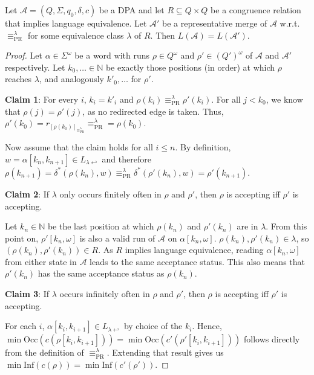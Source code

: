 \begin{theorem}
	Let $\mathcal{A} = (Q, \Sigma, q_0, \delta, c)$ be a DPA and let $R \subseteq Q \times Q$ be a congruence relation that implies language equivalence. Let $\mathcal{A}'$ be a representative merge of $\mathcal{A}$ w.r.t. $\equiv_\text{PR}^\lambda$ for some equivalence class $\lambda$ of $R$. Then $L(\mathcal{A}) = L(\mathcal{A}')$.
\end{theorem}

\begin{proof}
	Let $\alpha \in \Sigma^\omega$ be a word with runs $\rho \in Q^\omega$ and $\rho' \in (Q')^\omega$ of $\mathcal{A}$ and $\mathcal{A}'$ respectively. Let $k_0, \dots \in \mathbb{N}$ be exactly those positions (in order) at which $\rho$ reaches $\lambda$, and analogously $k'_0, \dots$ for $\rho'$.

	\vspace{5pt}
	\textbf{Claim 1}: For every $i$, $k_i = k'_i$ and $\rho(k_i) \equiv_\text{PR}^\lambda \rho'(k_i)$.
	For all $j < k_0$, we know that $\rho(j) = \rho'(j)$, as no redirected edge is taken. Thus, $\rho'(k_0) = r_{[\rho(k_0)]_{\equiv_\text{PR}^\lambda}} \equiv_\text{PR}^\lambda = \rho(k_0)$.
	
	Now assume that the claim holds for all $i \leq n$. By definition, $w = \alpha[k_n, k_{n+1}] \in L_{\lambda \hookleftarrow}$ and therefore $\rho(k_{n+1}) = \delta^*(\rho(k_n), w) \equiv_\text{PR}^\lambda \delta^*(\rho'(k_n), w) = \rho'(k_{n+1})$.
	
	\vspace{5pt}
	\textbf{Claim 2}: If $\lambda$ only occurs finitely often in $\rho$ and $\rho'$, then $\rho$ is accepting iff $\rho'$ is accepting. 
	
	Let $k_n \in \mathbb{N}$ be the last position at which $\rho(k_n)$ and $\rho'(k_n)$ are in $\lambda$. From this point on, $\rho'[k_n, \omega]$ is also a valid run of $\mathcal{A}$ on $\alpha[k_n, \omega]$. $\rho(k_n), \rho'(k_n) \in \lambda$, so $(\rho(k_n), \rho'(k_n)) \in R$. As $R$ implies language equivalence, reading $\alpha[k_n, \omega]$ from either state in $\mathcal{A}$ leads to the same acceptance status. This also means that $\rho'(k_n)$ has the same acceptance status as $\rho(k_n)$.
	
	\vspace{5pt}
	\textbf{Claim 3}: If $\lambda$ occurs infinitely often in $\rho$ and $\rho'$, then $\rho$ is accepting iff $\rho'$ is accepting. 
	
	For each $i$, $\alpha[k_i, k_{i+1}] \in L_{\lambda \hookleftarrow}$ by choice of the $k_i$. Hence, $\min \text{Occ}(c(\rho[k_i, k_{i+1}])) = \min \text{Occ}(c'(\rho'[k_i, k_{i+1}]))$ follows directly from the definition of $\equiv_\text{PR}^\lambda$. Extending that result gives us $\min \text{Inf}(c(\rho)) = \min \text{Inf}(c'(\rho'))$. 
\end{proof}


